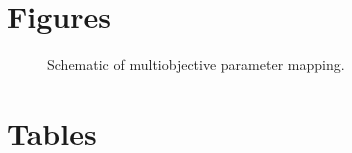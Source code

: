 \documentclass{bmcart}
\begin{document}
\begin{backmatter}



\clearpage
\section*{Figures}

\begin{figure}[h]
  \caption{Schematic of multiobjective parameter mapping. }
\end{figure}


\clearpage
\section*{Tables}




\end{backmatter}
\end{document}
